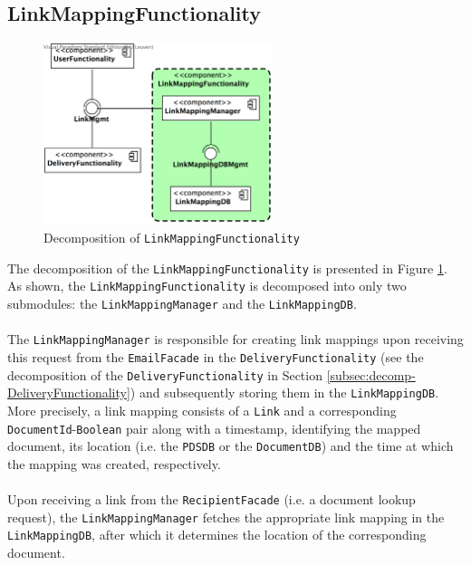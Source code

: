 \documentclass[a4paper,10pt]{article}
\begin{document}
\subsection{LinkMappingFunctionality}\label{subsec:decomp-LinkMappingFunctionality}
\begin{figure}[!htp]
	\centering
	\includegraphics[width=0.6\textwidth]{LinkMappingFunctionality.png}
	\caption{Decomposition of \texttt{LinkMappingFunctionality}}
	\label{fig:decomp-LinkMappingFunctionality}
\end{figure}
\FloatBarrier
\noindent
The decomposition of the \texttt{LinkMappingFunctionality} is presented in Figure \ref{fig:decomp-LinkMappingFunctionality}. As shown, the \texttt{LinkMappingFunctionality} is decomposed into only two submodules: the \texttt{LinkMappingManager} and the \texttt{LinkMappingDB}.\\\\
The \texttt{LinkMappingManager} is responsible for creating link mappings upon receiving this request from the \texttt{EmailFacade} in the \texttt{DeliveryFunctionality} (see the decomposition of the \texttt{DeliveryFunctionality} in Section \ref{subsec:decomp-DeliveryFunctionality}) and subsequently storing them in the \texttt{LinkMappingDB}. More precisely, a link mapping consists of a \texttt{Link} and a corresponding \texttt{DocumentId}-\texttt{Boolean} pair along with a timestamp, identifying the mapped document, its location (i.e. the \texttt{PDSDB} or the \texttt{DocumentDB}) and the time at which the mapping was created, respectively.\\\\
Upon receiving a link from the \texttt{RecipientFacade} (i.e. a document lookup request), the \texttt{LinkMappingManager} fetches the appropriate link mapping in the \texttt{LinkMappingDB}, after which it determines the location of the corresponding document.
\end{document}
